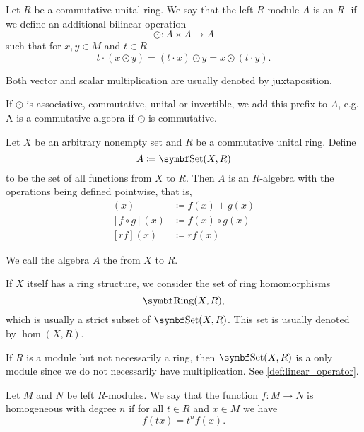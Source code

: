 \begin{definition}\label{def:algebra_over_ring}\cite[408]{Knapp2016BAlg}
  Let \( R \) be a commutative unital ring. We say that the left \( R \)-module \( A \) is an \( R \)- if we define an additional bilinear  operation
  \begin{equation*}
    \odot: A \times A \to A
  \end{equation*}
  such that for \( x, y \in M \) and \( t \in R \)
  \begin{equation*}
    t \cdot (x \odot y) = (t \cdot x) \odot y = x \odot (t \cdot y).
  \end{equation*}

  Both vector and scalar multiplication are usually denoted by juxtaposition.

  If \( \odot \) is associative, commutative, unital or invertible, we add this prefix to \( A \), e.g. A is a commutative algebra if \( \odot \) is commutative.
\end{definition}

\begin{proposition}\label{thm:functions_over_ring_form_algebra}
  Let \( X \) be an arbitrary nonempty set and \( R \) be a commutative unital ring. Define
  \begin{equation*}
    A \coloneqq \Cat{Set}(X, R)
  \end{equation*}
  to be the set of all functions from \( X \) to \( R \). Then \( A \) is an \( R \)-algebra with the operations being defined pointwise, that is,
  \begin{align*}
    [f + g](x) &\coloneqq f(x) + g(x) \\
    [f \circ g](x) &\coloneqq f(x) \circ g(x) \\
    [rf](x) &\coloneqq r f(x) 
  \end{align*}

  We call the algebra \( A \) the  from \( X \) to \( R \).

  If \( X \) itself has a ring structure, we consider the set of ring homomorphisms
  \begin{equation*}
    \Cat{Ring}(X, R),
  \end{equation*}
  which is usually a strict subset of \( \Cat{Set}(X, R) \). This set is usually denoted by \( \hom(X, R) \).

  If \( R \) is a module but not necessarily a ring, then \( \Cat{Set}(X, R) \) is a only module since we do not necessarily have multiplication. See \cref{def:linear_operator}.
\end{proposition}

\begin{definition}\label{def:homogenous_function}
  Let \( M \) and \( N \) be left \( R \)-modules. We say that the function \( f: M \to N \) is homogeneous with degree \( n \) if for all \( t \in R \) and \( x \in M \) we have
  \begin{equation*}
    f(t x) = t^n f(x).
  \end{equation*}
\end{definition}
